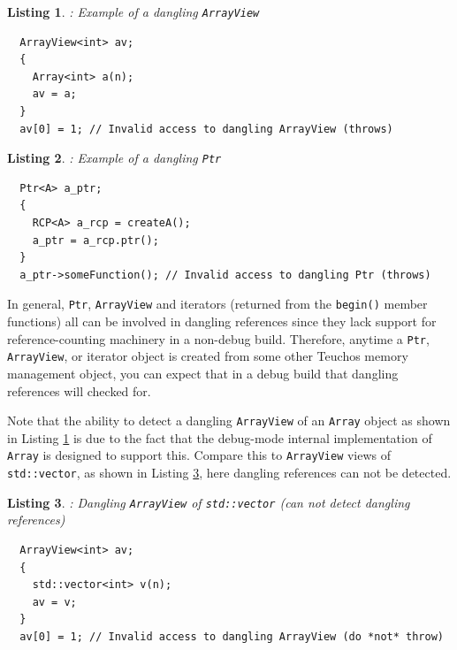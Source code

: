 \documentclass[pdf,ps2pdf,11pt]{SANDreport}
\newtheorem{listing}{Listing}
\begin{document}
\begin{listing}: Example of a dangling {}\texttt{ArrayView} \\
\label{listing:Array-dangling-ArrayView}
{\small\begin{verbatim}
  ArrayView<int> av;
  {
    Array<int> a(n);
    av = a;
  }
  av[0] = 1; // Invalid access to dangling ArrayView (throws)
\end{verbatim}}
\end{listing}

\begin{listing}: Example of a dangling {}\texttt{Ptr} \\
\label{listing:RCP-dangling-Ptr}
{\small\begin{verbatim}
  Ptr<A> a_ptr;
  {
    RCP<A> a_rcp = createA();
    a_ptr = a_rcp.ptr();
  }
  a_ptr->someFunction(); // Invalid access to dangling Ptr (throws)
\end{verbatim}}
\end{listing}

In general, {}\texttt{Ptr}, {}\texttt{ArrayView} and iterators
(returned from the {}\texttt{begin()} member functions) all can be
involved in dangling references since they lack support for
reference-counting machinery in a non-debug build.  Therefore, anytime
a {}\texttt{Ptr}, {}\texttt{ArrayView}, or iterator object is created
from some other Teuchos memory management object, you can expect that
in a debug build that dangling references will checked for.

Note that the ability to detect a dangling {}\texttt{ArrayView} of an
{}\texttt{Array} object as shown in Listing
{}\ref{listing:Array-dangling-ArrayView} is due to the fact that the
debug-mode internal implementation of {}\texttt{Array} is designed to
support this.  Compare this to {}\texttt{ArrayView} views of
{}\texttt{std::vector}, as shown in Listing
{}\ref{listing:vector-dangling-ArrayView}, here dangling references
can not be detected.

\begin{listing}: Dangling {}\texttt{ArrayView} of {}\texttt{std::vector}
(can not detect dangling references) \\
\label{listing:vector-dangling-ArrayView}
{\small\begin{verbatim}
  ArrayView<int> av;
  {
    std::vector<int> v(n);
    av = v;
  }
  av[0] = 1; // Invalid access to dangling ArrayView (do *not* throw)
\end{verbatim}}
\end{listing}
\end{document}
